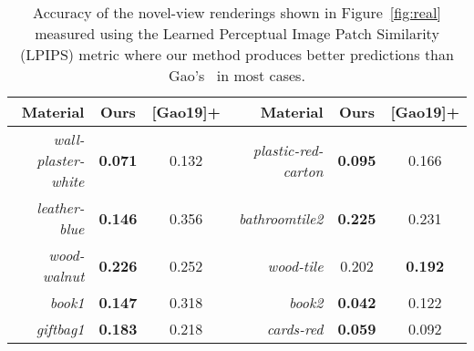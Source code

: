 %
\begin{table}[t]
    \centering
    \small
    \addtolength{\tabcolsep}{-3pt}
    \caption{\label{tab:main}
    	Accuracy of the novel-view renderings shown in Figure~\ref{fig:real} measured using the Learned Perceptual Image Patch Similarity (LPIPS) metric where our method produces better predictions than Gao's~ in most cases.
    }
    \begin{tabular}{rccrcc}
        \textbf{Material} & \textbf{Ours} & \textbf{[Gao19]+} & \textbf{Material} & \textbf{Ours} & \textbf{[Gao19]+}\\
        \toprule
        \textit{wall-plaster-white} & \textbf{0.071} & 0.132 & \textit{plastic-red-carton} & \textbf{0.095} & 0.166 \\
        \textit{leather-blue} & \textbf{0.146} & 0.356 & \textit{bathroomtile2} & \textbf{0.225} & 0.231 \\
        \textit{wood-walnut} & \textbf{0.226} & 0.252 & \textit{wood-tile} & 0.202 & \textbf{0.192} \\
        \textit{book1} & \textbf{0.147} & 0.318 & \textit{book2} & \textbf{0.042} & 0.122 \\
        \textit{giftbag1} & \textbf{0.183} & 0.218 & \textit{cards-red} & \textbf{0.059} & 0.092 \\
        \bottomrule
    \end{tabular}
\end{table}
